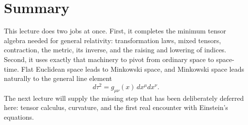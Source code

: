 \section{Summary}

This lecture does two jobs at once. First, it completes the minimum tensor algebra needed for general relativity: transformation laws, mixed tensors, contraction, the metric, its inverse, and the raising and lowering of indices. Second, it uses exactly that machinery to pivot from ordinary space to space-time. Flat Euclidean space leads to Minkowski space, and Minkowski space leads naturally to the general line element
\[
d\tau^2=g_{\mu\nu}(x)\,dx^\mu dx^\nu.
\]
The next lecture will supply the missing step that has been deliberately deferred here: tensor calculus, curvature, and the first real encounter with Einstein's equations.
